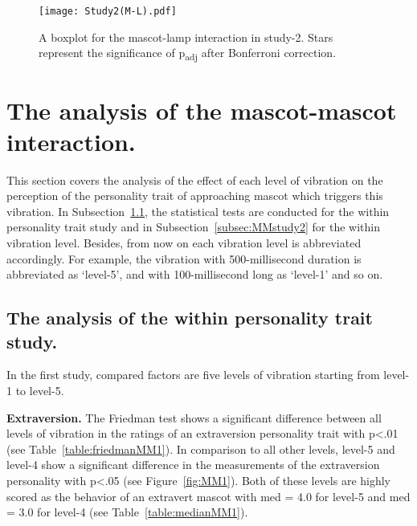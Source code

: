 \begin{figure}[hbt!]
    \centering
    \texttt{[image: Study2(M-L).pdf]}
    \caption[]{A boxplot for the mascot-lamp interaction in study-2.
    Stars represent the significance of p\textsubscript{adj} after Bonferroni correction.\footnotemark}
    \label{fig:ML2}
\end{figure}
\section{The analysis of the mascot-mascot interaction.}
\label{sec:m-m}
This section covers the analysis of the effect of each level of vibration on the perception
of the personality trait of approaching mascot which triggers this vibration.
In Subsection~\ref{subsec:MMstudy1}, the statistical tests are conducted for the within
personality trait study and in Subsection~\ref{subsec:MMstudy2} for the within vibration level.
Besides, from now on each vibration level is abbreviated accordingly.
For example, the vibration with 500-millisecond duration is abbreviated
as ‘level-5’, and with 100-millisecond long as ‘level-1’ and so on.

\subsection{The analysis of the within personality trait study.}
\label{subsec:MMstudy1}
In the first study, compared factors are five levels of vibration starting from level-1 to level-5.

\par\textbf{Extraversion.}
The Friedman test shows a significant difference between all levels of vibration in the
ratings of an extraversion personality trait with p<.01 (see Table~\ref{table:friedmanMM1}).
In comparison to all other levels, level-5 and level-4 show a significant difference
in the measurements of the extraversion personality with p<.05 (see Figure~\ref{fig:MM1}).
Both of these levels are highly scored as the behavior of an extravert mascot
with med = 4.0 for level-5 and med = 3.0 for level-4 (see Table~\ref{table:medianMM1}).

